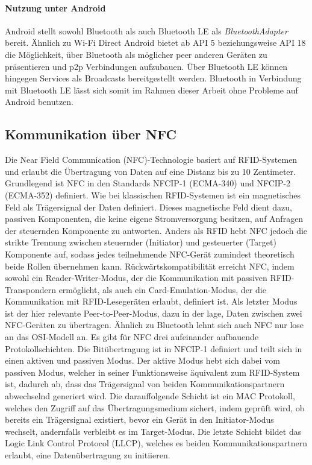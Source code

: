         \paragraph{Nutzung unter Android}
        Android stellt sowohl Bluetooth als auch Bluetooth LE als {\it BluetoothAdapter} bereit. Ähnlich zu Wi-Fi Direct  Android bietet ab API 5 beziehungsweise API 18 die Möglichkeit, über Bluetooth als möglicher peer anderen Geräten zu präsentieren und
        p2p Verbindungen aufzubauen. Über Bluetooth LE können hingegen Services als Broadcasts bereitgestellt werden. Bluetooth in Verbindung mit Bluetooth LE lässt sich somit im Rahmen dieser Arbeit ohne Probleme auf Android benutzen.

    \subsection{Kommunikation über NFC}
        Die Near Field Communication (NFC)-Technologie basiert auf RFID-Systemen und erlaubt die Übertragung von Daten auf eine Distanz bis zu 10 Zentimeter.
        Grundlegend ist NFC in den Standards NFCIP-1 (ECMA-340) und NFCIP-2 (ECMA-352) definiert. Wie bei klassischen RFID-Systemen ist ein magnetisches Feld
        als Trägersignal der Daten definiert. Dieses magnetische Feld dient dazu, passiven Komponenten, die keine eigene Stromversorgung besitzen, auf Anfragen
        der steuernden Komponente zu antworten. Anders als RFID hebt NFC jedoch die strikte Trennung zwischen steuernder (Initiator) und gesteuerter (Target) Komponente auf, sodass
        jedes teilnehmende NFC-Gerät zumindest theoretisch beide Rollen übernehmen kann.\cite[S.89]{Langer} Rückwärtskompatibilität erreicht NFC,
        indem sowohl ein Reader-Writer-Modus, der die Kommunikation mit passiven RFID-Transpondern ermöglicht,
        als auch ein Card-Emulation-Modus, der die Kommunikation mit RFID-Lesegeräten erlaubt, definiert ist.\cite[S.99f.]{Langer}
        Als letzter Modus ist der hier relevante Peer-to-Peer-Modus, dazu in der lage, Daten zwischen zwei NFC-Geräten zu übertragen.
        Ähnlich zu Bluetooth lehnt sich auch NFC nur lose an das OSI-Modell an. Es gibt für NFC drei aufeinander aufbauende Protokollschichten.
        Die Bitübertragung ist in NFCIP-1 definiert und teilt sich in einen aktiven und passiven Modus. Der aktive Modus hebt sich dabei vom passiven Modus,
        welcher in seiner Funktionsweise äquivalent zum RFID-System ist, dadurch ab, dass das Trägersignal von beiden Kommunikationspartnern abwechselnd generiert wird.
        Die darauffolgende Schicht ist ein MAC Protokoll, welches den Zugriff auf das Übertragungsmedium sichert, indem geprüft wird, ob bereits ein Trägersignal existiert,
        bevor ein Gerät in den Initiator-Modus wechselt, andernfalls verbleibt es im Target-Modus.
        Die letzte Schicht bildet das Logic Link Control Protocol (LLCP), welches es beiden Kommunikationspartnern erlaubt, eine Datenübertragung zu initiieren.\cite[S91.f, S.97]{Langer}

